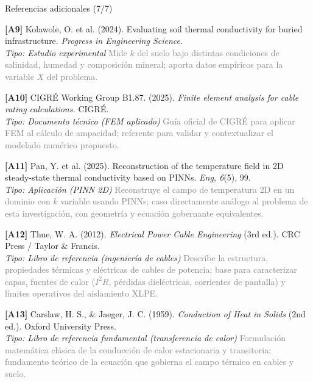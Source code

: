 \documentclass[aspectratio=169]{beamer}
\begin{document}
\begin{frame}{Referencias adicionales (7/7)}
\small\justifying

\textbf{[A9]} Kolawole, O. et al. (2024). Evaluating soil thermal
conductivity for buried infrastructure. \textit{Progress in Engineering
Science.}\\
\textcolor{purple!70!black}{\footnotesize\textit{Tipo: Estudio experimental}} \quad
\textcolor{gray}{\footnotesize Mide $k$ del suelo bajo distintas condiciones de
salinidad, humedad y composición mineral; aporta datos empíricos para la
variable $X$ del problema.}

\medskip
\textbf{[A10]} CIGRÉ Working Group B1.87. (2025). \textit{Finite element
analysis for cable rating calculations.} CIGRÉ.\\
\textcolor{purple!70!black}{\footnotesize\textit{Tipo: Documento técnico (FEM aplicado)}} \quad
\textcolor{gray}{\footnotesize Guía oficial de CIGRÉ para aplicar FEM al cálculo
de ampacidad; referente para validar y contextualizar el modelado numérico
propuesto.}

\medskip
\textbf{[A11]} Pan, Y. et al. (2025). Reconstruction of the temperature field
in 2D steady-state thermal conductivity based on PINNs. \textit{Eng,
6}(5), 99.\\
\textcolor{purple!70!black}{\footnotesize\textit{Tipo: Aplicación (PINN 2D)}} \quad
\textcolor{gray}{\footnotesize Reconstruye el campo de temperatura 2D en un
dominio con $k$ variable usando PINNs; caso directamente análogo al problema
de esta investigación, con geometría y ecuación gobernante equivalentes.}

\medskip
\textbf{[A12]} Thue, W. A. (2012). \textit{Electrical Power Cable Engineering}
(3rd ed.). CRC Press / Taylor \& Francis.\\
\textcolor{purple!70!black}{\footnotesize\textit{Tipo: Libro de referencia (ingeniería de cables)}} \quad
\textcolor{gray}{\footnotesize Describe la estructura, propiedades térmicas y
eléctricas de cables de potencia; base para caracterizar capas, fuentes de calor
($I^2 R$, pérdidas dieléctricas, corrientes de pantalla) y límites operativos
del aislamiento XLPE.}

\medskip
\textbf{[A13]} Carslaw, H. S., \& Jaeger, J. C. (1959). \textit{Conduction of
Heat in Solids} (2nd ed.). Oxford University Press.\\
\textcolor{purple!70!black}{\footnotesize\textit{Tipo: Libro de referencia fundamental (transferencia de calor)}} \quad
\textcolor{gray}{\footnotesize Formulación matemática clásica de la conducción
de calor estacionaria y transitoria; fundamento teórico de la ecuación que
gobierna el campo térmico en cables y suelo.}
\end{frame}
\end{document}
